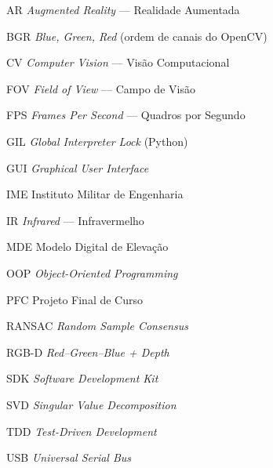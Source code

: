 
\begin{siglas}
\item[AR] \textit{Augmented Reality} — Realidade Aumentada
\item[BGR] \textit{Blue, Green, Red} (ordem de canais do OpenCV)
\item[CV] \textit{Computer Vision} — Visão Computacional
\item[FOV] \textit{Field of View} — Campo de Visão
\item[FPS] \textit{Frames Per Second} — Quadros por Segundo
\item[GIL] \textit{Global Interpreter Lock} (Python)
\item[GUI] \textit{Graphical User Interface}
\item[IME] Instituto Militar de Engenharia
\item[IR] \textit{Infrared} — Infravermelho
\item[MDE] Modelo Digital de Elevação
\item[OOP] \textit{Object-Oriented Programming}
\item[PFC] Projeto Final de Curso
\item[RANSAC] \textit{Random Sample Consensus}
\item[RGB-D] \textit{Red--Green--Blue + Depth}
\item[SDK] \textit{Software Development Kit}
\item[SVD] \textit{Singular Value Decomposition}
\item[TDD] \textit{Test-Driven Development}
\item[USB] \textit{Universal Serial Bus}
\end{siglas}


